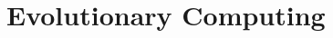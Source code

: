 \documentclass[a4paper]{article}
\title{\docTitle}
\author{Moritz}
\date{\today}
\begin{document}
\maketitle
\tableofcontents


\section{Evolutionary Computing}

\end{document}

